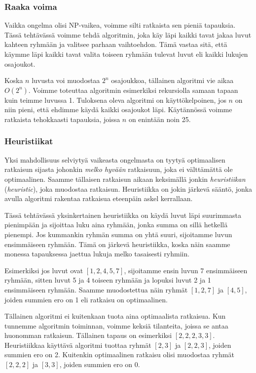 \subsubsection{Raaka voima}

Vaikka ongelma olisi NP-vaikea, voimme silti ratkaista sen
pieniä tapauksia.
Tässä tehtävässä voimme tehdä algoritmin,
joka käy läpi kaikki tavat jakaa luvut kahteen ryhmään
ja valitsee parhaan vaihtoehdon.
Tämä vastaa sitä, että käymme läpi kaikki tavat valita
toiseen ryhmään tulevat luvut
eli kaikki lukujen osajoukot.

Koska $n$ luvusta voi muodostaa $2^n$ osajoukkoa,
tällainen algoritmi vie aikaa $O(2^n)$.
Voimme toteuttaa algoritmin esimerkiksi rekursiolla
samaan tapaan kuin teimme luvussa 1.
Tuloksena oleva algoritmi on käyttökelpoinen, jos $n$ on niin pieni,
että ehdimme käydä kaikki osajoukot läpi.
Käytännössä voimme ratkaista tehokkaasti tapauksia,
joissa $n$ on enintään noin 25.

\subsubsection{Heuristiikat}


Yksi mahdollisuus selviytyä vaikeasta ongelmasta on tyytyä
optimaalisen ratkaisun sijasta johonkin \emph{melko hyvään} ratkaisuun,
joka ei välttämättä ole optimaalinen.
Saamme tällaisen ratkaisun aikaan keksimällä jonkin
\emph{heuristiikan} (\emph{heuristic}), joka muodostaa ratkaisun.
Heuristiikka on jokin järkevä sääntö, jonka avulla
algoritmi rakentaa ratkaisua eteenpäin askel kerrallaan.

Tässä tehtävässä yksinkertainen heuristiikka on
käydä luvut läpi suurimmasta pienimpään ja sijoittaa
luku aina ryhmään, jonka summa on sillä hetkellä pienempi.
Jos kummankin ryhmän summa on yhtä suuri,
sijoitamme luvun ensimmäiseen ryhmään.
Tämä on järkevä heuristiikka, koska näin saamme monessa tapauksessa
jaettua lukuja melko tasaisesti ryhmiin.

Esimerkiksi jos luvut ovat $[1,2,4,5,7]$, sijoitamme ensin
luvun 7 ensim\-mäiseen ryhmään, sitten luvut 5 ja 4 toiseen ryhmään
ja lopuksi luvut 2 ja 1 ensimmäiseen ryhmään.
Saamme muodostettua näin ryhmät $[1,2,7]$ ja $[4,5]$,
joiden summien ero on 1 eli ratkaisu on optimaalinen.

Tällainen algoritmi ei kuitenkaan tuota aina optimaalista ratkaisua.
Kun tunnemme algoritmin toiminnan, voimme keksiä tilanteita,
joissa se antaa huonomman ratkaisun.
Tällainen tapaus on esimerkiksi $[2,2,2,3,3]$.
Heuristiikkaa käyttävä algoritmi tuottaa ryhmät $[2,3]$ ja $[2,2,3]$,
joiden summien ero on 2.
Kuitenkin optimaalinen ratkaisu olisi muodostaa ryhmät
$[2,2,2]$ ja $[3,3]$, joiden summien ero on 0.

